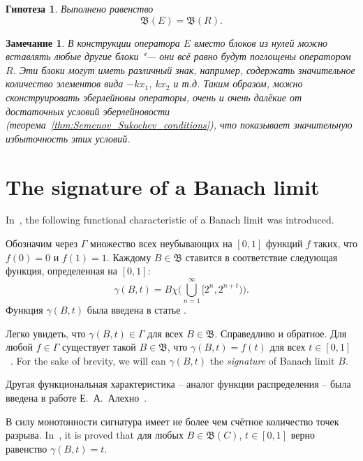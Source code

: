 \documentclass[a4paper,14pt]{article} %
\newcommand{\B}{\ensuremath{\mathfrak{B}}}
\theoremstyle{plain}
\newtheorem{remark}[lemma]{Замечание}
\newtheorem{hypothesis}[lemma]{Гипотеза}
\begin{document}
\begin{hypothesis}
	Выполнено равенство
	\begin{equation}
		\B(E) = \B(R)
		.
	\end{equation}
\end{hypothesis}

\begin{remark}
	В конструкции оператора $E$ вместо блоков из нулей можно вставлять любые другие блоки "---
	они всё равно будут поглощены оператором $R$.
	Эти блоки могут иметь различный знак, например, содержать значительное количество
	элементов вида $-kx_1$, $kx_2$ и т.д.
	Таким образом, можно сконструировать эберлейновы операторы, очень и очень далёкие
	от достаточных условий эберлейновости (теорема~\ref{thm:Semenov_Sukochev_conditions}),
	что показывает значительную избыточность этих условий.
\end{remark}




\section{The signature of a Banach limit}

In~\cite{semenov2019mainclasses_rus}, the following functional characteristic of a Banach limit was introduced.

 Обозначим через $\Gamma$ множество всех неубывающих на $[0, 1]$ функций $f$ таких,
    что $f(0) = 0$ и $f(1) = 1$. Каждому $B \in \mathfrak B$
    ставится в соответствие следующая функция, определенная на $[0, 1]$:
    $$
		\gamma(B, t) = B \chi\Bigg(\bigcup^\infty_{n = 1} [2^n, 2^{n + t})\Bigg)
		.
    $$
    Функция $\gamma(B,t)$ была введена в статье \cite{semenov2019mainclasses_rus}.

    Легко увидеть, что $\gamma (B, t) \in \Gamma$ для всех $B \in \mathfrak B$.
    Справедливо и обратное. Для любой $f \in \Gamma$ существует такой
	$B \in \mathfrak B$, что $\gamma(B, t) = f(t)$ для всех
	$t \in [0, 1]$~\cite[Предложение 2]{semenov2019mainclasses_rus}.
    For the sake of brevity, we will can $\gamma(B,t)$ the \emph{signature}
    of Banach limit $B$.

	Другая функциональная характеристика -- аналог функции распределения -- была введена в работе Е.~А.~Алехно~\cite{Alekhno2:TODO}.

	В силу монотонности сигнатура имеет не более чем счётное количество точек разрыва.
	In~\cite[Теорема 23]{semenov2019mainclasses_rus}, it is proved that
	для любых $B \in \mathfrak B(C)$, $t \in [0, 1]$ верно равенство $\gamma (B, t) = t$.
\end{document}
